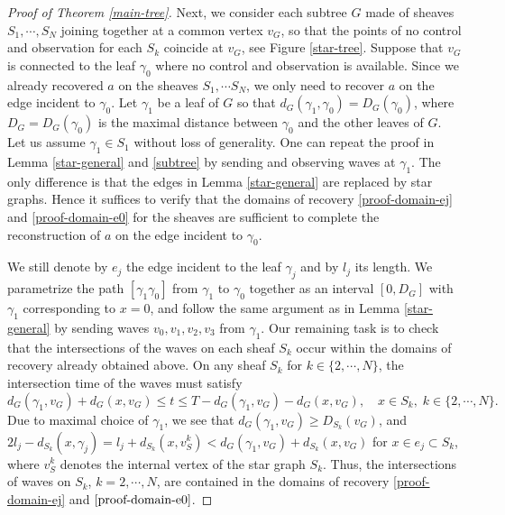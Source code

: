 \documentclass[11pt]{amsart}
\theoremstyle{definition}
\theoremstyle{plain}
\numberwithin{equation}{section}
\begin{document}
\begin{proof}[Proof of Theorem \ref{main-tree}]
\smallskip
Next, we consider each subtree $G$ made of sheaves $S_1, \cdots, S_N$ joining together at a common vertex $v_G$, so that the points of no control and observation for each $S_k$ coincide at $v_G$, see Figure \ref{star-tree}.
Suppose that $v_G$ is connected to the leaf $\gamma_0$ where no control and observation is available.
Since we already recovered $a$ on the sheaves $S_1,\cdots S_N$, we only need to recover $a$ on the edge incident to $\gamma_0$.
Let $\gamma_1$ be a leaf of $G$ so that $d_G(\gamma_1,\gamma_0)=D_G(\gamma_0)$, where $D_G=D_G(\gamma_0)$ is the maximal distance between $\gamma_0$ and the other leaves of $G$.
Let us assume $\gamma_1\in S_1$ without loss of generality. 
One can repeat the proof in Lemma \ref{star-general} and \ref{subtree} by sending and observing waves at $\gamma_1$. The only difference is that the edges in Lemma \ref{star-general} are replaced by star graphs. Hence it suffices to verify that the domains of recovery \eqref{proof-domain-ej} and \eqref{proof-domain-e0} for the sheaves are sufficient to complete the reconstruction of $a$ on the edge incident to $\gamma_0$. 


We still denote by $e_j$ the edge incident to the leaf $\gamma_j$ and by $l_j$ its length.
We parametrize the path $[\gamma_1 \gamma_0]$ from $\gamma_1$ to $\gamma_0$ together as an interval $[0,D_G]$ with $\gamma_1$ corresponding to $x=0$, and follow the same argument as in Lemma \ref{star-general} by sending waves $v_0,v_1,v_2,v_3$ from $\gamma_1$.
Our remaining task is to check that the intersections of the waves on each sheaf $S_k$ occur within the domains of recovery already obtained above.
On any sheaf $S_k$ for $k\in \{2,\cdots,N\}$, the intersection time of the waves must satisfy 
\begin{equation}
d_G(\gamma_1,v_G)+d_G(x,v_G) \leq t \leq T-d_G(\gamma_1,v_G)-d_G(x,v_G), \quad x\in S_k,\; k\in \{2,\cdots, N\}.
\end{equation}
Due to maximal choice of $\gamma_1$, we see that $d_G(\gamma_1,v_G)\geq D_{S_k}(v_G)$, and $2l_j-d_{S_k}(x,\gamma_j)=l_j+d_{S_k}(x,v_{S}^k)< d_G(\gamma_1,v_G)+d_{S_k}(x,v_G)$ for $x\in e_j\subset S_k$, where $v_S^k$ denotes the internal vertex of the star graph $S_k$. 
Thus, the intersections of waves on $S_k$, $k=2,\cdots,N$, are contained in the domains of recovery \eqref{proof-domain-ej} and $\eqref{proof-domain-e0}$.



\end{proof}
\end{document}
